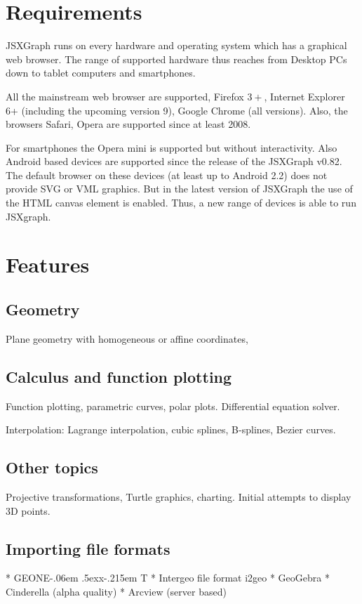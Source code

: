 \documentclass[12pt,a4paper]{article}%
\def\GEONExT{GEONE\kern-.06em \lower.5ex\hbox{x}\kern-.215em T}
\begin{document}
\section{Requirements}
JSXGraph runs on every hardware and operating system which has a graphical 
web browser. The range of supported hardware thus reaches from Desktop PCs 
down to tablet computers and smartphones.

All the mainstream web browser are supported, Firefox $3+$, Internet Explorer
6+ (including the upcoming version 9), Google Chrome (all versions). 
Also, the browsers Safari, Opera are supported since at least 2008. 

For smartphones the Opera mini is supported but without interactivity.
Also Android based devices are supported since the release of the JSXGraph v0.82.
The default browser on these devices (at least up to Android 2.2) does not provide
SVG or VML graphics. But in the latest version of JSXGraph 
the use of the HTML canvas element is enabled. Thus, a new range of devices is 
able to run JSXgraph.


\section{Features}
\subsection{Geometry}
Plane geometry with 
homogeneous or affine coordinates,



\subsection{Calculus and function plotting}
Function plotting, parametric curves, polar plots. 
Differential equation solver.

Interpolation: Lagrange interpolation, 
cubic splines, B-splines, Bezier curves.



\subsection{Other topics}
Projective transformations,
Turtle graphics, 
charting.
Initial attempts to display 3D points.



\subsection{Importing file formats}
    * \GEONExT{}
    * Intergeo file format i2geo
    * GeoGebra
    * Cinderella (alpha quality)
    * Arcview (server based) 
\end{document}
